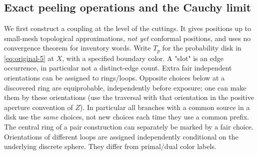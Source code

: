 \subsection{Exact peeling operations and the Cauchy limit}\label{cut:peeling}

We first construct a coupling at the level of the cuttings.
It gives positions up to small-mesh topological approximations, \emph{not yet} conformal positions, and uses no convergence theorem for inventory words.
Write \(T_p\) for the probability disk in \eqref{eq:original-5} at \(X\), with a specified boundary color. A "slot" is an edge occurrence, in particular not a distinct-edge count.
Extra fair independent orientations can be assigned to rings/loops.
Opposite choices below at a discovered ring are equiprobable, independently before exposure; one can make them by these orientations (use the traversal with that orientation in the positive aperture convention of \(Z\)).
In particular all branches with a common source in a disk use the \emph{same} choices, not new choices each time they use a common prefix.
The central ring of a pair construction can separately be marked by a fair choice.
Orientations of different loops are assigned independently conditional on the underlying discrete sphere.
They differ from primal/dual color labels.

